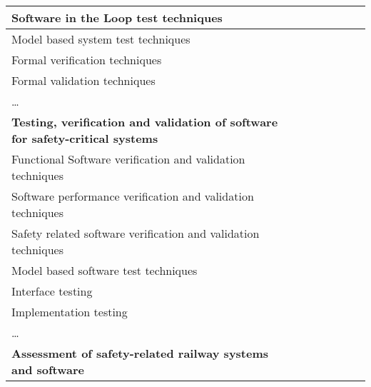 \documentclass[a4paper, 11pt]{article}
\begin{document}
\begin{center}
\begin{longtable}{|r|r|r|r|r|r|r|r|}
    \hline
    \multicolumn{1}{|l|}{Software in the Loop test techniques } & \multicolumn{1}{l|}{} &       &       &       &       &       &  \bigstrut\\
    \hline
    \multicolumn{1}{|l|}{Model based system test techniques } & \multicolumn{1}{l|}{} &       &       &       &       &       &  \bigstrut\\
    \hline
    \multicolumn{1}{|l|}{Formal verification techniques} & \multicolumn{1}{l|}{} &       &       &       &       &       &  \bigstrut\\
    \hline
    \multicolumn{1}{|l|}{Formal validation techniques} & \multicolumn{1}{l|}{} &       &       &       &       &       &  \bigstrut\\
    \hline
    \multicolumn{1}{|l|}{…} & \multicolumn{1}{l|}{} &       &       &       &       &       &  \bigstrut[t]\\
    \multicolumn{1}{|l|}{\textbf{Testing, verification and validation of software for safety-critical systems}} & \multicolumn{1}{l|}{\textbf{}} &       &       &       &       &       &  \\
    \multicolumn{1}{|l|}{Functional Software verification and validation techniques} & \multicolumn{1}{l|}{} &       &       &       &       &       &  \bigstrut[b]\\
    \hline
    \multicolumn{1}{|l|}{Software performance verification and validation techniques} & \multicolumn{1}{l|}{} &       &       &       &       &       &  \bigstrut\\
    \hline
    \multicolumn{1}{|l|}{Safety related software verification and validation techniques} & \multicolumn{1}{l|}{} &       &       &       &       &       &  \bigstrut\\
    \hline
    \multicolumn{1}{|l|}{Model based software test techniques } & \multicolumn{1}{l|}{} &       &       &       &       &       &  \bigstrut\\
    \hline
    \multicolumn{1}{|l|}{Interface testing} & \multicolumn{1}{l|}{} &       &       &       &       &       &  \bigstrut\\
    \hline
    \multicolumn{1}{|l|}{Implementation testing} & \multicolumn{1}{l|}{} &       &       &       &       &       &  \bigstrut\\
    \hline
    \multicolumn{1}{|l|}{…} & \multicolumn{1}{l|}{} &       &       &       &       &       &  \bigstrut[t]\\
    \multicolumn{1}{|l|}{\textbf{Assessment of safety-related railway systems and software}} & \multicolumn{1}{l|}{\textbf{}} &       &       &       &       &       &  \\

\end{longtable}
\end{center}
\end{document}
